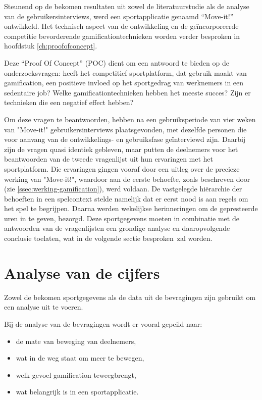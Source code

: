 Steunend op de bekomen resultaten uit zowel de literatuurstudie als de analyse van de gebruikersinterviews, werd een sportapplicatie genaamd ``Move-it!'' ontwikkeld. Het technisch aspect van de ontwikkeling en de geïncorporeerde competitie bevorderende gamificationtechnieken worden verder besproken in hoofdstuk \ref{ch:proofofconcept}.

Deze ``Proof Of Concept'' (POC) dient om een antwoord te bieden op de onderzoeksvragen: heeft het competitief sportplatform, dat gebruik maakt van gamification, een positieve invloed op het sportgedrag van werknemers in een sedentaire job? Welke gamificationtechnieken hebben het meeste succes? Zijn er technieken die een negatief effect hebben?

Om deze vragen te beantwoorden, hebben na een gebruiksperiode van vier weken van "Move-it!" gebruikersinterviews plaatsgevonden, met dezelfde personen die voor aanvang van de ontwikkelings- en gebruiksfase geïnterviewd zijn.
Daarbij zijn de vragen quasi identiek gebleven, maar putten de deelnemers voor het beantwoorden van de tweede vragenlijst uit hun ervaringen met het sportplatform. Die ervaringen gingen vooraf door een uitleg over de precieze werking van "Move-it!", waardoor aan de eerste behoefte, zoals beschreven door \textcite{Siang2003} (zie \ref{ssec:werking-gamification}), werd voldaan. De vastgelegde hiërarchie der behoeften in een spelcontext stelde namelijk dat er eerst nood is aan regels om het spel te begrijpen. Daarna werden wekelijkse herinneringen om de gepresteerde uren in te geven, bezorgd. Deze sportgegevens moeten in combinatie met de antwoorden van de vragenlijsten een grondige analyse en daaropvolgende conclusie toelaten, wat in de volgende sectie besproken zal worden.

\section{Analyse van de cijfers}

Zowel de bekomen sportgegevens als de data uit de bevragingen zijn gebruikt om een analyse uit te voeren.

Bij de analyse van de bevragingen wordt er vooral gepeild naar:
\begin{itemize}
    \item de mate van beweging van deelnemers,
    \item wat in de weg staat om meer te bewegen,
    \item welk gevoel gamification teweegbrengt,
    \item wat belangrijk is in een sportapplicatie.
\end{itemize}

